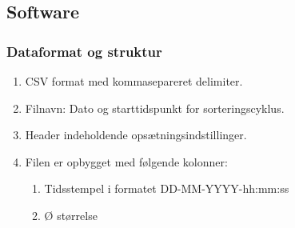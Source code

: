 \subsection{Software}

\subsubsection{Dataformat og struktur}
\begin{enumerate}
\item CSV format med kommasepareret delimiter. 
\item Filnavn: Dato og starttidspunkt for sorteringscyklus.
\item Header indeholdende opsætningsindstillinger.
\item Filen er opbygget med følgende kolonner: 
\begin{enumerate}
\item Tidsstempel i formatet DD-MM-YYYY-hh:mm:ss
\item Ø størrelse
\end{enumerate}
\end{enumerate}

